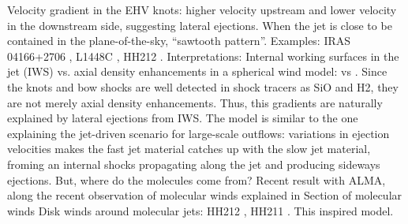\documentclass[12pt]{mythesis}
\begin{document}

Velocity gradient in the EHV knots: higher velocity upstream and lower velocity in the downstream side, suggesting lateral ejections. When the jet is close to be contained in the plane-of-the-sky, ``sawtooth pattern''. Examples: IRAS 04166+2706 \citep{santiago-garcia2009, tafalla2017}, L1448C \citep{hirano2010}, HH212 \citep{lee2015}. Interpretations: Internal working surfaces in the jet (IWS) vs. axial density enhancements in a spherical wind model: \citet{tafalla2017} vs \citet{wang2019}. Since the knots and bow shocks are well detected in shock tracers as SiO and H2, they are not merely axial density enhancements. Thus, this gradients are naturally explained by lateral ejections from IWS. The model is similar to the one explaining the jet-driven scenario for large-scale outflows: variations in ejection velocities makes the fast jet material catches up with the slow jet material, froming an internal shocks propagating along the jet and producing sideways ejections. But, where do the molecules come from?
Recent result with ALMA, along the recent observation of molecular winds explained in Section of molecular winds 
Disk winds around molecular jets: HH212 \citep{tabone2017, lee2018_HH212, lee2021}, HH211 \citep{lee2018_HH211}.
This inspired \citet{tabone2018} model. 
\end{document}
